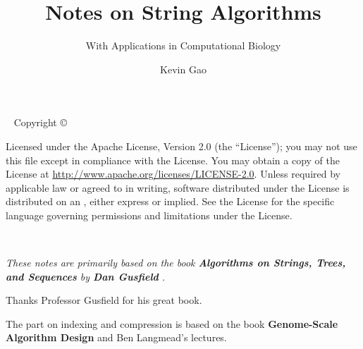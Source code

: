 \documentclass[nobib]{tufte-book}
\title{Notes on String Algorithms}
\subtitle{With Applications in Computational Biology}
\author{Kevin Gao}
\begin{document}
\frontmatter



\maketitle


\newpage
\begin{fullwidth}
~\vfill
\thispagestyle{empty}
\setlength{\parindent}{0pt}
\setlength{\parskip}{\baselineskip}
Copyright \copyright\ \the\year\ \thanklessauthor

\par{}

\par Licensed under the Apache License, Version 2.0 (the ``License''); you may not
use this file except in compliance with the License. You may obtain a copy
of the License at \url{http://www.apache.org/licenses/LICENSE-2.0}. Unless
required by applicable law or agreed to in writing, software distributed
under the License is distributed on an , either express or implied. See the
License for the specific language governing permissions and limitations
under the License.


\end{fullwidth}

\tableofcontents

\cleardoublepage
~\vfill

{\noindent\fontsize{18}{22}\selectfont\itshape
These notes are primarily based on the book \textbf{Algorithms on Strings, Trees, and Sequences} by \textbf{Dan Gusfield} \cite{gusfield_1997}.

\hfill

\noindent Thanks Professor Gusfield for his great book.

\hfill

The part on indexing and compression is based on the book \textbf{Genome-Scale Algorithm Design} \cite{makinen_belazzougui_cunial_tomescu_2015} and Ben Langmead's lectures.
}

\vfill
\vfill


\cleardoublepage

\end{document}
